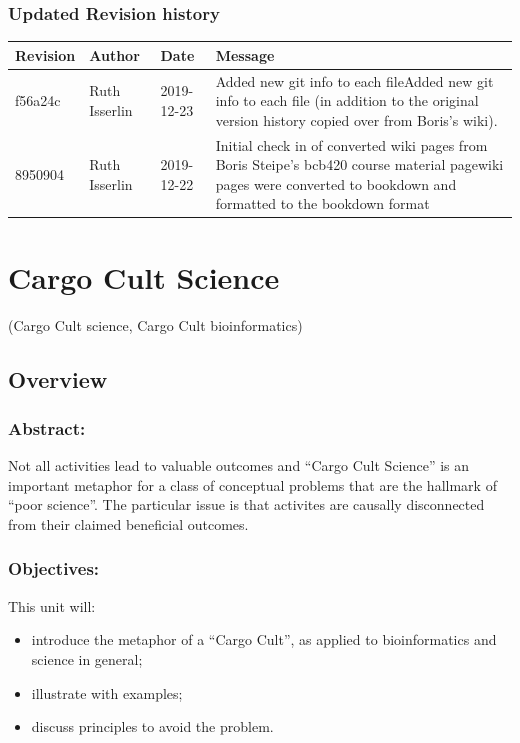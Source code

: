 \documentclass[]{book}
\providecommand{\tightlist}{%
  \setlength{\itemsep}{0pt}\setlength{\parskip}{0pt}}
\begin{document}
\subsection{Updated Revision history}\label{updated-revision-history-3}

\begin{tabular}{l|l|l|l}
\hline
Revision & Author & Date & Message\\
\hline
f56a24c & Ruth Isserlin & 2019-12-23 & Added new git info to each fileAdded new git info to each file (in addition to the original version history copied over from Boris's wiki).\\
\hline
8950904 & Ruth Isserlin & 2019-12-22 & Initial check in of converted wiki pages from Boris Steipe's bcb420 course material pagewiki pages were converted to bookdown and formatted to the bookdown format\\
\hline
\end{tabular}

\chapter{Cargo Cult Science}\label{cargocult}

(Cargo Cult science, Cargo Cult bioinformatics)

\section{Overview}\label{overview-5}

\subsection{Abstract:}\label{abstract-5}

Not all activities lead to valuable outcomes and ``Cargo Cult Science''
is an important metaphor for a class of conceptual problems that are the
hallmark of ``poor science''. The particular issue is that activites are
causally disconnected from their claimed beneficial outcomes.

\subsection{Objectives:}\label{objectives-5}

This unit will:

\begin{itemize}
\tightlist
\item
  introduce the metaphor of a ``Cargo Cult'', as applied to
  bioinformatics and science in general;
\item
  illustrate with examples;
\item
  discuss principles to avoid the problem.
\end{itemize}
\end{document}
